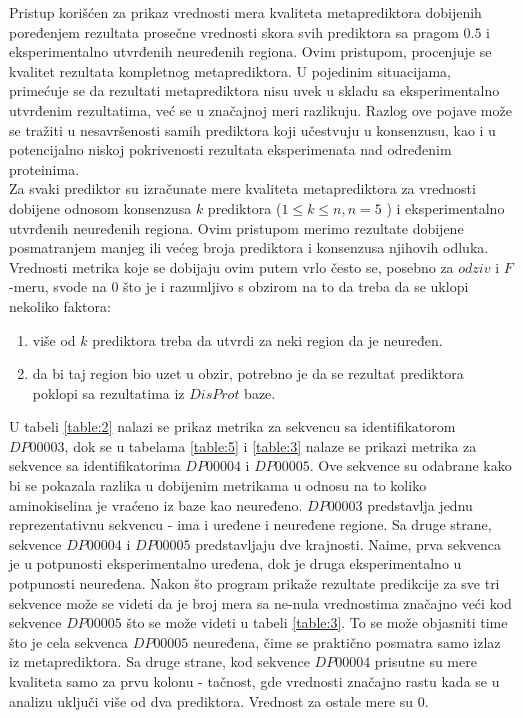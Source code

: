 Pristup korišćen za prikaz vrednosti mera kvaliteta metaprediktora dobijenih poređenjem rezultata prosečne vrednosti skora svih prediktora sa pragom $0.5$ i eksperimentalno utvrđenih neuređenih regiona. Ovim pristupom, procenjuje se kvalitet rezultata kompletnog metaprediktora. U pojedinim situacijama, primećuje se da rezultati metaprediktora nisu uvek u skladu sa eksperimentalno utvrđenim rezultatima, već se u značajnoj meri razlikuju. Razlog ove pojave može se tražiti u nesavršenosti samih prediktora koji učestvuju u konsenzusu, kao i u potencijalno niskoj pokrivenosti rezultata eksperimenata nad određenim proteinima. \\
Za svaki prediktor su izračunate mere kvaliteta metaprediktora za vrednosti dobijene odnosom konsenzusa $k$ prediktora ($1\leq k \leq n, n=5$ ) i eksperimentalno utvrđenih neuređenih regiona.  Ovim pristupom merimo rezultate dobijene posmatranjem manjeg ili većeg broja prediktora i konsenzusa njihovih odluka. Vrednosti metrika koje se dobijaju ovim putem vrlo često se, posebno za $odziv$ i $F$-meru, svode na $0$ što je i razumljivo s obzirom na to da treba da se uklopi nekoliko faktora:
\begin{enumerate}
\item više od $k$ prediktora treba da utvrdi za neki region da je neuređen.
\item da bi taj region bio uzet u obzir, potrebno je da se rezultat prediktora poklopi sa rezultatima iz $DisProt$ baze.  
\end{enumerate}

U tabeli \ref{table:2} nalazi se prikaz metrika za sekvencu sa identifikatorom $DP00003$, dok se u tabelama \ref{table:5} i \ref{table:3}  nalaze se prikazi metrika za sekvence sa identifikatorima $DP00004$ i $DP00005$. Ove sekvence su odabrane kako bi se pokazala razlika u dobijenim metrikama u odnosu na to koliko aminokiselina 	je vraćeno iz baze kao neuređeno. $DP00003$ predstavlja jednu reprezentativnu sekvencu - ima i uređene i neuređene regione. Sa druge strane, sekvence $DP00004$ i $DP00005$ predstavljaju dve krajnosti. Naime, prva sekvenca je u potpunosti eksperimentalno uređena, dok je druga eksperimentalno u potpunosti neuređena. Nakon što program prikaže rezultate predikcije za sve tri sekvence može se videti da je broj mera sa ne-nula vrednostima značajno veći kod sekvence $DP00005$ što se može videti u tabeli \ref{table:3}. To se može objasniti time što je cela sekvenca $DP00005$ neuređena, čime se praktično posmatra samo izlaz iz metaprediktora. Sa druge strane, kod sekvence $DP00004$ prisutne su mere kvaliteta samo za prvu kolonu - tačnost, gde vrednosti značajno rastu kada se u analizu uključi više od dva prediktora. Vrednost za ostale mere su $0$.	

